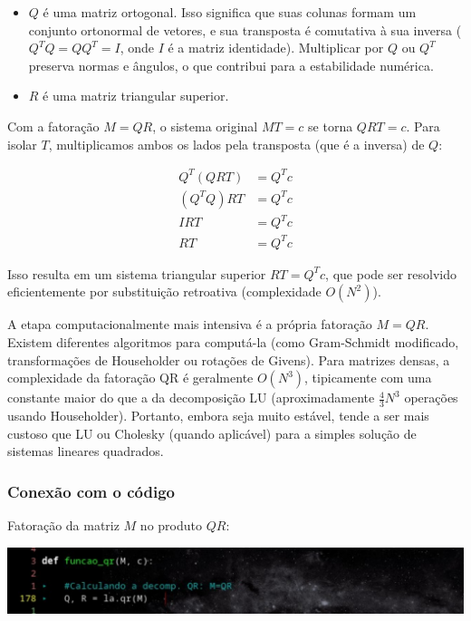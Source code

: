 \documentclass{article}
\begin{document}
    \begin{itemize}
        \item $Q$ é uma matriz ortogonal. Isso significa que suas colunas formam um conjunto ortonormal de vetores, e sua transposta é comutativa à sua inversa ($Q^TQ = QQ^T = I$, onde $I$ é a matriz identidade). Multiplicar por $Q$ ou $Q^T$ preserva normas e ângulos, o que contribui para a estabilidade numérica.
        
        \item $R$ é uma matriz triangular superior.
    \end{itemize}

    Com a fatoração $M = QR$, o sistema original $MT = c$ se torna $QRT = c$. Para isolar $T$, multiplicamos ambos os lados pela transposta (que é a inversa) de $Q$:

    \begin{align*}
    Q^T (QRT) &= Q^T c \\
    (Q^TQ)RT &= Q^T c \\
    I RT &= Q^T c \\
    RT &= Q^T c
    \end{align*}

    Isso resulta em um sistema triangular superior $RT = Q^T c$, que pode ser resolvido eficientemente por substituição retroativa (complexidade $O(N^2)$).

    A etapa computacionalmente mais intensiva é a própria fatoração $M = QR$. Existem diferentes algoritmos para computá-la (como Gram-Schmidt modificado, transformações de Householder ou rotações de Givens). Para matrizes densas, a complexidade da fatoração QR é geralmente $O(N^3)$, tipicamente com uma constante maior do que a da decomposição LU (aproximadamente $\frac{4}{3}N^3$ operações usando Householder). Portanto, embora seja muito estável, tende a ser mais custoso que LU ou Cholesky (quando aplicável) para a simples solução de sistemas lineares quadrados.

    \subsubsection{Conexão com o código}

    Fatoração da matriz $M$ no produto $QR$:

    \begin{center}
    \includegraphics[width=0.8\linewidth]{imgs/qr_1.png}
    \end{center}
\end{document}
